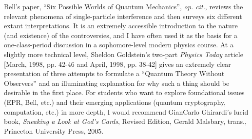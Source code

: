 \documentclass[aps,prc,onecolumn,letterpaper,floatfix,12pt]{revtex4}
\begin{document}
\begin{thebibliography}{99}
  Bell's paper, ``Six Possible Worlds of Quantum
  Mechanics'', \emph{op. cit.}, reviews the relevant phenomena of
  single-particle interference and then surveys six different extant
  interpretations.  It is an extremely accessible introduction to the
  nature (and existence) of the controversies, and I have often used
  it as the basis for a one-class-period discussion in a
  sophomore-level modern physics course.  At a slightly more technical
  level, Sheldon Goldstein's two-part \emph{Physics Today} article
  [March, 1998, pp. 42-46 and April, 1998, pp. 38-42] gives an
  extremely clear presentation of three attempts to formulate a
  ``Quantum Theory Without Observers'' and an illuminating explanation
  for why such a thing should be desirable in the first place.  For
  students who want to explore foundational issues (EPR, Bell, etc.)
  and their emerging applications (quantum cryptography, computation,
  etc.) in more depth, I would recommend GianCarlo Ghirardi's lucid
  book, \emph{Sneaking a Look at God's Cards}, Revised Edition, Gerald
  Malsbary, trans., Princeton University Press, 2005.  

\end{thebibliography}
\end{document}
